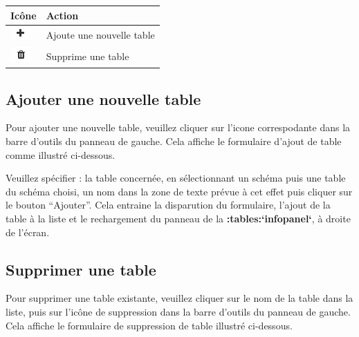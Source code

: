\documentclass[letterpaper,10pt,french]{sphinxmanual}
\begin{document}
\begin{tabulary}{\linewidth}{|L|L|}
\hline

\textbf{Icône}
 & 
\textbf{Action}
\\
\hline
\includegraphics{add5.png}
 & 
Ajoute une nouvelle table
\\
\hline
\includegraphics{delete6.png}
 & 
Supprime une table
\\
\hline\end{tabulary}



\subsection{Ajouter une nouvelle table}
\label{tables/tbllist:ajouter-une-nouvelle-table}
Pour ajouter une nouvelle table, veuillez cliquer sur l'icone
correspodante dans la barre d'outils du panneau de gauche. Cela affiche
le formulaire d'ajout de table comme illustré ci-dessous.


Veuillez spécifier : la table concernée, en sélectionnant un schéma puis une table du
schéma choisi, un nom dans la zone de texte prévue à cet effet puis
cliquer sur le bouton ``Ajouter''. Cela entraine la disparution du
formulaire, l'ajout de la table à la liste et le rechargement du
panneau de la {\color{red}\bfseries{}:tables:{}`infopanel{}`}, à droite de l'écran.


\subsection{Supprimer une table}
\label{tables/tbllist:supprimer-une-table}
Pour supprimer une table existante, veuillez cliquer sur le nom de
la table dans la liste, puis sur l'icône de suppression dans la barre
d'outils du panneau de gauche. Cela affiche le formulaire de
suppression de table illustré ci-dessous.
\end{document}
